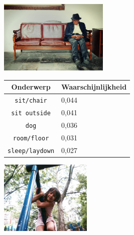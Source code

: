 \begin{figure}
\begin{subfigure}{\textwidth}
    \centering
    \begin{minipage}[t][3.5cm]{.5\linewidth}
    \centering
    \vspace{0pt}
    \includegraphics[height=3.5cm]{Images/LDA/4862204000.jpg}
    \end{minipage}\hfill
    \begin{minipage}[t]{.5\textwidth}
    \centering
    \vspace{0pt}
    \begin{tabular}{cl}
            Onderwerp                           & Waarschijnlijkheid\\
            \hline
            \texttt{sit/chair}             & 0,044 \\
            \texttt{sit outside}                   & 0,041 \\
            \texttt{dog}                 & 0,036 \\
            \texttt{room/floor}           & 0,031 \\
            \texttt{sleep/laydown}        & 0,027\\
            \hline
        \end{tabular}
    \end{minipage}
\end{subfigure}
\vspace*{4mm}
\begin{subfigure}{\textwidth}
    \centering
    \begin{minipage}[t][3.5cm]{.5\linewidth}
    \centering
    \vspace{0pt}
    \includegraphics[height=3.5cm]{Images/LDA/3643021980.jpg}
    \end{minipage}\hfill

\end{subfigure}
\end{figure}

